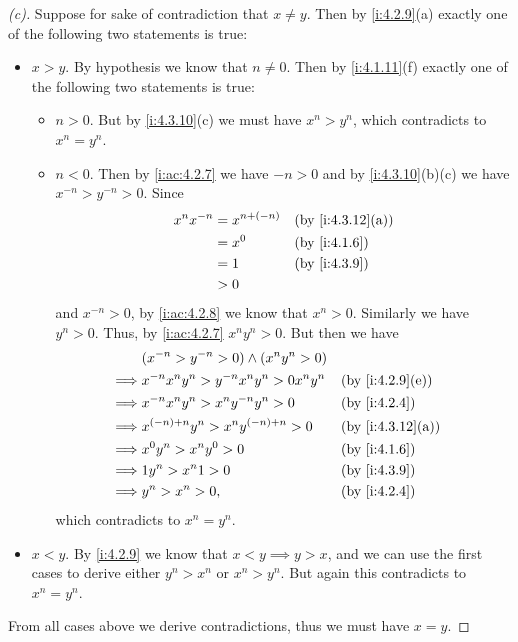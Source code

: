 \begin{proof}[(c)]
  Suppose for sake of contradiction that \(x \neq y\).
  Then by \cref{i:4.2.9}(a) exactly one of the following two statements is true:
  \begin{itemize}
    \item \(x > y\).
          By hypothesis we know that \(n \neq 0\).
          Then by \cref{i:4.1.11}(f) exactly one of the following two statements is true:
          \begin{itemize}
            \item \(n > 0\).
                  But by \cref{i:4.3.10}(c) we must have \(x^n > y^n\), which contradicts to \(x^n = y^n\).
            \item \(n < 0\).
                  Then by \cref{i:ac:4.2.7} we have \(-n > 0\) and by \cref{i:4.3.10}(b)(c) we have \(x^{-n} > y^{-n} > 0\).
                  Since
                  \begin{align*}
                    x^n x^{-n} & = x^{n + (-n)} &  & \by{i:4.3.12}[a] \\
                               & = x^0          &  & \by{i:4.1.6}     \\
                               & = 1            &  & \by{i:4.3.9}     \\
                               & > 0
                  \end{align*}
                  and \(x^{-n} > 0\), by \cref{i:ac:4.2.8} we know that \(x^n > 0\).
                  Similarly we have \(y^n > 0\).
                  Thus, by \cref{i:ac:4.2.7} \(x^n y^n > 0\).
                  But then we have
                  \begin{align*}
                             & (x^{-n} > y^{-n} > 0) \land (x^n y^n > 0)                         \\
                    \implies & x^{-n} x^n y^n > y^{-n} x^n y^n > 0 x^n y^n &  & \by{i:4.2.9}[e]  \\
                    \implies & x^{-n} x^n y^n > x^n y^{-n} y^n > 0         &  & \by{i:4.2.4}     \\
                    \implies & x^{(-n) + n} y^n > x^n y^{(-n) + n} > 0     &  & \by{i:4.3.12}[a] \\
                    \implies & x^0 y^n > x^n y^0 > 0                       &  & \by{i:4.1.6}     \\
                    \implies & 1 y^n > x^n 1 > 0                           &  & \by{i:4.3.9}     \\
                    \implies & y^n > x^n > 0,                              &  & \by{i:4.2.4}
                  \end{align*}
                  which contradicts to \(x^n = y^n\).
          \end{itemize}
    \item \(x < y\).
          By \cref{i:4.2.9} we know that \(x < y \implies y > x\), and we can use the first cases to derive either \(y^n > x^n\) or \(x^n > y^n\).
          But again this contradicts to \(x^n = y^n\).
  \end{itemize}
  From all cases above we derive contradictions, thus we must have \(x = y\).
\end{proof}

